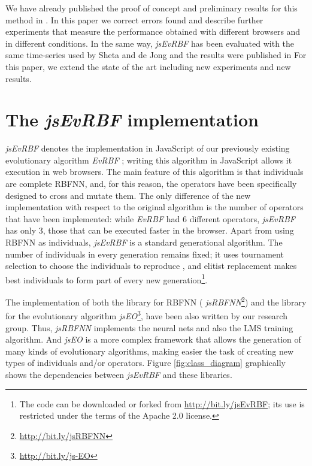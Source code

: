 \documentclass{article}
\begin{document}
We have already published the proof of concept and preliminary results
for this method in \cite{DBLP:conf/dcai/RivasPMAG16}. In this paper we
correct errors found and describe further experiments that measure the
performance obtained with different browsers and in different
conditions. In the same way, {\em jsEvRBF} has been evaluated with the same time-series
used by Sheta and de Jong \cite{Sheta2001} and the results were published in \cite{DBLP:conf/dcai/RivasPMAG16} For this paper, we extend the state of the art including new experiments and new results. %


\section{The {\em jsEvRBF} implementation} %
\label{sec:algorithm}
{\em jsEvRBF} denotes the implementation in JavaScript of our previously existing evolutionary algorithm {\em EvRBF} \cite{rivas03:EvRBF} ; writing this algorithm in JavaScript allows it execution in web browsers.
The main feature of this algorithm is that individuals are complete RBFNN, and, for this reason,
the operators have been specifically designed to cross and mutate them. The only difference of the new implementation with respect to the original algorithm is the number of operators that have been implemented: while {\em EvRBF} had 6 different operators, {\em jsEvRBF} has only 3, those that can be executed faster in the browser.%
Apart from using RBFNN as individuals, {\em jsEvRBF} is a standard generational algorithm. The number of individuals in every generation remains fixed; it uses tournament selection to choose the individuals to reproduce , and elitist replacement  makes best individuals to form part of every new generation\footnote{The code can be downloaded or forked from
  \url{http://bit.ly/jsEvRBF}; its use is restricted under the terms
  of the Apache 2.0 license.}.

The implementation of both the library for RBFNN ( {\em
  jsRBFNN}\footnote{\url{http://bit.ly/jsRBFNN}}) and the library for the evolutionary algorithm  {\em
  jsEO}\footnote{\url{http://bit.ly/js-EO}}, have been also written by
our research group. Thus, {\em jsRBFNN} implements the neural nets and also the LMS
training algorithm. %
And {\em jsEO} \cite{EvoStar2014:jsEO} is a more
complex framework that allows the generation of many kinds of
evolutionary algorithms, making easier the task of creating new types
of individuals and/or operators. Figure \ref{fig:class_diagram}
graphically shows the dependencies between {\em jsEvRBF} and these
libraries.
\end{document}
